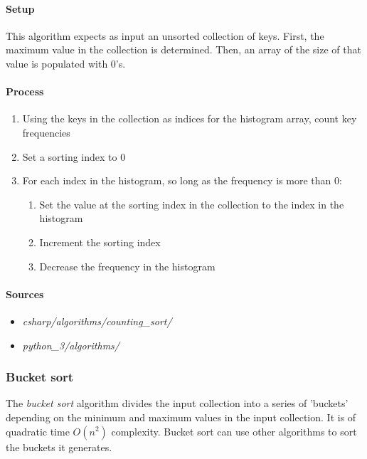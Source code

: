 \documentclass{article}
\begin{document}
{\paragraph{Setup}
This algorithm expects as input an unsorted collection of keys. First, the maximum value in the collection is
determined. Then, an array of the size of that value is populated with 0's.

\paragraph{Process}
\begin{enumerate}
\item{Using the keys in the collection as indices for the histogram array, count key frequencies}
\item{Set a sorting index to 0}
\item{For each index in the histogram, so long as the frequency is more than 0:}
  \begin{enumerate}
  \item{Set the value at the sorting index in the collection to the index in the histogram}
  \item{Increment the sorting index}
  \item{Decrease the frequency in the histogram}
  \end{enumerate}
\end{enumerate}

\begin{samepage}
  \paragraph{Sources}
  \begin{itemize}
  \item{{\em csharp/algorithms/counting\_sort/}}
  \item{{\em python\_3/algorithms/}}
  \end{itemize}
\end{samepage}


\subsubsection{Bucket sort}
The {\em bucket sort} algorithm divides the input collection into a series of 'buckets' depending on the minimum and
maximum values in the input collection. It is of quadratic time \(O(n^2)\) complexity. Bucket sort can use other
algorithms to sort the buckets it generates.

}
\end{document}
